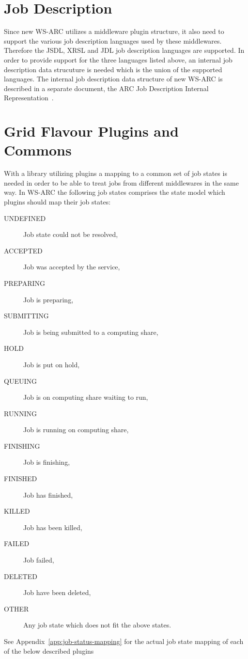 \documentclass{book}
\begin{document}
\chapter{Job Description}
\label{sec:jobdesc}
Since new WS-ARC utilizes a middleware plugin structure, it also need to
support the various job description languages used by these middlewares.
Therefore the JSDL, XRSL and JDL job description languages are supported.
In order to provide support for the
three languages listed above, an internal job description data strucuture
is needed which is the union of the supported languages. The internal job
description data structure of new WS-ARC is described in a separate document,
the ARC Job Description Internal Representation~\cite{internaljobdescription}.

\chapter{Grid Flavour Plugins and Commons}
\label{sec:plugins}
With a library utilizing plugins a mapping to a common set of job states
is needed in order to be able to treat jobs from different middlewares
in the same way. In WS-ARC the following job states comprises the state
model which plugins should map their job states:
\begin{description}
\item[UNDEFINED] Job state could not be resolved,
\item[ACCEPTED] Job was accepted by the service,
\item[PREPARING] Job is preparing,
\item[SUBMITTING] Job is being submitted to a computing share,
\item[HOLD] Job is put on hold,
\item[QUEUING] Job is on computing share waiting to run,
\item[RUNNING] Job is running on computing share,
\item[FINISHING] Job is finishing,
\item[FINISHED] Job has finished,
\item[KILLED] Job has been killed,
\item[FAILED] Job failed,
\item[DELETED] Job have been deleted,
\item[OTHER] Any job state which does not fit the above states.
\end{description}
See Appendix~\ref{app:job-status-mapping} for the actual job state
mapping of each of the below described plugins
\end{document}
